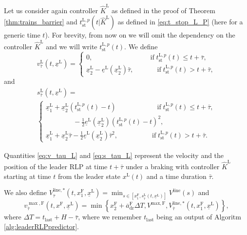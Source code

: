 Let us consider again controller $\hat{K}^\mathrm{L}$ as defined in the proof of Theorem \ref{thm:trains_barrier} and $t_{\mathrm{st}}^{\mathrm{L},p}(t |\hat{K}^\mathrm{L})$ as defined in \eqref{eq:t_stop_L_P} (here for a generic time $t$). For brevity, from now on we will omit the dependency on the controller $\hat{K}^\mathrm{L}$ and we will write $t_{\mathrm{st}}^{\mathrm{L},p}(t)$.
We define
\begin{equation}\label{eq:v_tau_L}
	v_{\bar{\tau}}^\mathrm{L}\left( t,\underline{x}^\mathrm{L} \right)=
	\begin{cases}
		0, \qquad \qquad \qquad \quad  \quad \; \, \text{if} \;  t_{\mathrm{st}}^{\mathrm{L},p}(t) \leq t+\bar{\tau}, \\
		\underline{x}_2^\mathrm{L}-\underline{e}^\mathrm{L}\left(\underline{x}_2^\mathrm{L}\right)\bar{\tau}, \qquad \quad \; \, \text{if} \; t_{\mathrm{st}}^{\mathrm{L},p}(t) > t+\bar{\tau},
	\end{cases}
\end{equation}
and
\begin{multline}\label{eq:s_tau_L}
	s_{\bar{\tau}}^\mathrm{L}\left( t,\underline{x}^\mathrm{L} \right)=\\
	\begin{cases}
		\underline{x}_1^\mathrm{L}+ \underline{x}_2^\mathrm{L}\left( t_{\mathrm{st}}^{\mathrm{L},p}(t) -t \right) \qquad \qquad \qquad    \text{if} \; t_{\mathrm{st}}^{\mathrm{L},p}(t) \leq t+\bar{\tau}, \\ \qquad \qquad  -\frac{1}{2}\underline{e}^\mathrm{L}\left(\underline{x}_2^\mathrm{L} \right)\left(t_{\mathrm{st}}^{\mathrm{L},p}(t) -t \right)^2,  \\
		\underline{x}_1^\mathrm{L}+ \underline{x}_2^\mathrm{L}\bar{\tau} - \frac{1}{2}\underline{e}^\mathrm{L}\left(\underline{x}_2^\mathrm{L} \right)\bar{\tau}^2, \quad \qquad \qquad \text{if}  \; t_{\mathrm{st}}^{\mathrm{L},p}(t) > t+\bar{\tau}.
	\end{cases}
\end{multline}

Quantities \eqref{eq:v_tau_L} and \eqref{eq:s_tau_L} represent the velocity and the position of the leader RLP at time $t+\bar{\tau}$ under a braking with controller $\hat{K}^\mathrm{L}$ starting at time $t$  from the leader state $x^\mathrm{L}(t)$ and a time duration $\bar{\tau}$. 


We also define  $V_{\bar{\tau}}^{\mathrm{line},*}(t,x_1^\mathrm{F},\underline{x}^\mathrm{L})=\min_{s\in \left[x_1^\mathrm{F} ,s_{\bar{\tau}}^\mathrm{L}\left(t,\underline{x}^\mathrm{L}\right)\right]} V^{\mathrm{line}}(s)$
and 
\begin{equation}\label{eq:v_tau_F_max}
	v_{\bar{\tau}}^{\max, \mathrm{F}}\left( t,x^\mathrm{F},\underline{x}^\mathrm{L} \right)=\min\left\{x_2^\mathrm{F}+\overline{a}_{\mathrm{dr}}^\mathrm{F}\Delta T,V^{\mathrm{max},\mathrm{F}},V_{\bar{\tau}}^{\mathrm{line},*}(t,x_1^\mathrm{F},\underline{x}^\mathrm{L})\right\},
\end{equation}
where $\Delta T =  t_{\mathrm{last}}+H-\bar{\tau}$, where we remember $t_{\mathrm{last}}$ being an output of Algoritm \ref{alg:leaderRLPpredictor}.


